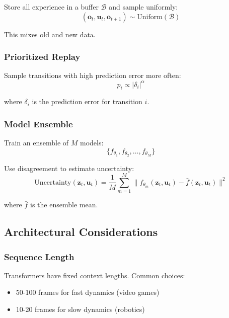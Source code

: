 Store all experience in a buffer $\mathcal{B}$ and sample uniformly:
\begin{equation}
(\mathbf{o}_t, \mathbf{u}_t, \mathbf{o}_{t+1}) \sim \text{Uniform}(\mathcal{B})
\end{equation}

This mixes old and new data.

\subsubsection{Prioritized Replay}

Sample transitions with high prediction error more often:
\begin{equation}
p_i \propto |\delta_i|^\alpha
\end{equation}

where $\delta_i$ is the prediction error for transition $i$.

\subsubsection{Model Ensemble}

Train an ensemble of $M$ models:
\begin{equation}
\{f_{\theta_1}, f_{\theta_2}, \ldots, f_{\theta_M}\}
\end{equation}

Use disagreement to estimate uncertainty:
\begin{equation}
\text{Uncertainty}(\mathbf{z}_t, \mathbf{u}_t) = \frac{1}{M} \sum_{m=1}^M \| f_{\theta_m}(\mathbf{z}_t, \mathbf{u}_t) - \bar{f}(\mathbf{z}_t, \mathbf{u}_t) \|^2
\end{equation}

where $\bar{f}$ is the ensemble mean.

\subsection{Architectural Considerations}

\subsubsection{Sequence Length}

Transformers have fixed context lengths. Common choices:
\begin{itemize}
    \item 50-100 frames for fast dynamics (video games)
    \item 10-20 frames for slow dynamics (robotics)
\end{itemize}

